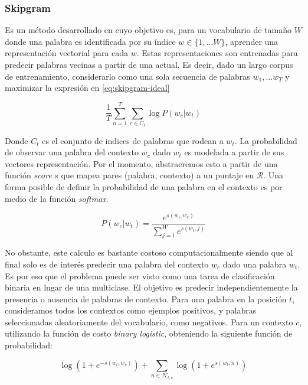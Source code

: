 \subsubsection{Skipgram}

Es un método desarrollado en \citep{Mikolov-2013} cuyo objetivo es, para un
vocabulario de tamaño $W$ donde una palabra es identificada por su índice $w \in
\{1, ... W\}$, aprender una representación vectorial para cada $w$. Estas
representaciones son entrenadas para predecir palabras vecinas a partir de una
actual. Es decir, dado un largo corpus de entrenamiento, considerarlo como una
sola secuencia de palabras $w_1, ... w_T$ y maximizar la expresión en
\ref{eq:skipgram-ideal}

\begin{equation} \label{eq:skipgram-ideal}
    \frac{1}{T} \sum_{n=1}^{T}
                    \sum_{c \in C_t} \log P(w_c | w_t)
\end{equation}

Donde $C_t$ es el conjunto de indices de palabras que rodean a $w_t$. La
probabilidad de observar una palabra del contexto $w_c$ dado $w_t$ es modelada a
partir de sus vectores representación. Por el momento, abstraeremos esto a
partir de una función \emph{score} $s$ que mapea pares (palabra, contexto) a un
puntaje en $\mathcal{R}$. Una forma posible de definir la probabilidad de una
palabra en el contexto es por medio de la función \emph{softmax}.

\begin{equation} \label{eq:skipram-softmax}
    P(w_{c}|w_{t}) = \frac{e^{s(w_t, w_c)}}{\sum_{j=1}^{W} e^{s(w_t, j)}}
\end{equation}

No obstante, este calculo es bastante costoso computacionalmente siendo que al
final solo es de interés predecir una palabra del contexto $w_c$ dado una
palabra $w_t$. Es por eso que el problema puede ser visto como una tarea de
clasificación binaria en lugar de una multiclase. El objetivo es predecir
independientemente la presencia o ausencia de palabras de contexto. Para una
palabra en la posición $t$, consideramos todos los contextos como ejemplos
positivos, y palabras seleccionadas aleatoriamente del vocabulario, como
negativos. Para un contexto $c$, utilizando la función de costo \emph{binary
logistic}, obteniendo la siguiente función de probabilidad:

\begin{equation}
    \log\left( 1 + e^{-s(w_t, w_c)} \right) +
    \sum_{n \in \mathcal{N}_{t, c}} \log\left( 1 + e^{s(w_t, n)} \right)
\end{equation}

